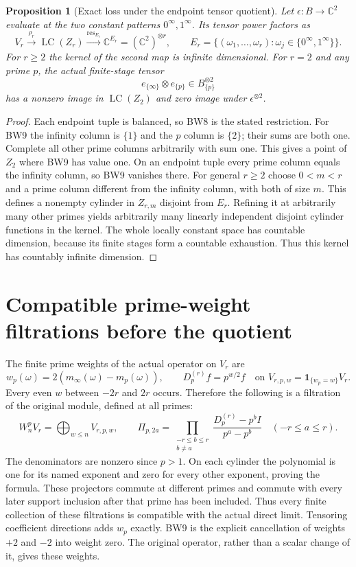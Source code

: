 \documentclass[11pt]{article}
\newtheorem{proposition}[theorem]{Proposition}
\newcommand{\C}{\mathbb C}
\newcommand{\LC}{\operatorname{LC}}
\begin{document}
\begin{proposition}[Exact loss under the endpoint tensor quotient]
Let $\epsilon:B\to\C^2$ evaluate at the two constant patterns
$0^\infty,1^\infty$. Its tensor power factors as
\[
 V_r\xrightarrow{\rho_r}\LC(Z_r)
 \xrightarrow{\operatorname{res}_{E_r}}\C^{E_r}
       =(\C^2)^{\otimes r},\qquad
 E_r=\{(\omega_1,\ldots,\omega_r):
              \omega_j\in\{0^\infty,1^\infty\}\}.
 \tag{BW8}
\]
For $r\ge2$ the kernel of the second map is infinite dimensional.
For $r=2$ and any prime $p$, the actual finite-stage tensor
\[
 e_{\{\infty\}}\otimes e_{\{p\}}\in B_{\{p\}}^{\otimes2}
 \tag{BW9}
\]
has a nonzero image in $\LC(Z_2)$ and zero image under
$\epsilon^{\otimes2}$.
\end{proposition}
\begin{proof}
Each endpoint tuple is balanced, so BW8 is the stated restriction.
For BW9 the infinity column is $\{1\}$ and the $p$ column is
$\{2\}$; their sums are both one. Complete all other prime columns
arbitrarily with sum one. This gives a point of $Z_2$ where BW9
has value one. On an endpoint tuple every prime column equals the
infinity column, so BW9 vanishes there.
For general $r\ge2$ choose $0<m<r$ and a prime column different
from the infinity column, with both of size $m$. This defines a
nonempty cylinder in $Z_{r,m}$ disjoint from $E_r$. Refining it at
arbitrarily many other primes yields arbitrarily many linearly
independent disjoint cylinder functions in the kernel. The whole
locally constant space has countable dimension, because its finite
stages form a countable exhaustion. Thus this kernel has countably
infinite dimension.
\end{proof}

\section{Compatible prime-weight filtrations before the quotient}
The finite prime weights of the actual operator on $V_r$ are
\[
 w_p(\omega)=2(m_\infty(\omega)-m_p(\omega)),\qquad
 D_p^{(r)}f=p^{w/2}f
 \quad\text{on }V_{r,p,w}=\mathbf1_{\{w_p=w\}}V_r.
 \tag{BW10}
\]
Every even $w$ between $-2r$ and $2r$ occurs. Therefore the following
is a filtration of the original module, defined at all primes:
\[
 W_n^pV_r=\bigoplus_{w\le n}V_{r,p,w},\qquad
 \Pi_{p,2a}=\prod_{\substack{-r\le b\le r\\b\ne a}}
       \frac{D_p^{(r)}-p^bI}{p^a-p^b}\quad(-r\le a\le r).
 \tag{BW11}
\]
The denominators are nonzero since $p>1$. On each cylinder the
polynomial is one for its named exponent and zero for every other
exponent, proving the formula. These projectors commute at different
primes and commute with every later support inclusion after that
prime has been included. Thus every finite collection of these
filtrations is compatible with the actual direct limit. Tensoring
coefficient directions adds $w_p$ exactly. BW9 is the explicit
cancellation of weights $+2$ and $-2$ into weight zero. The original
operator, rather than a scalar change of it, gives these weights.
\end{document}
